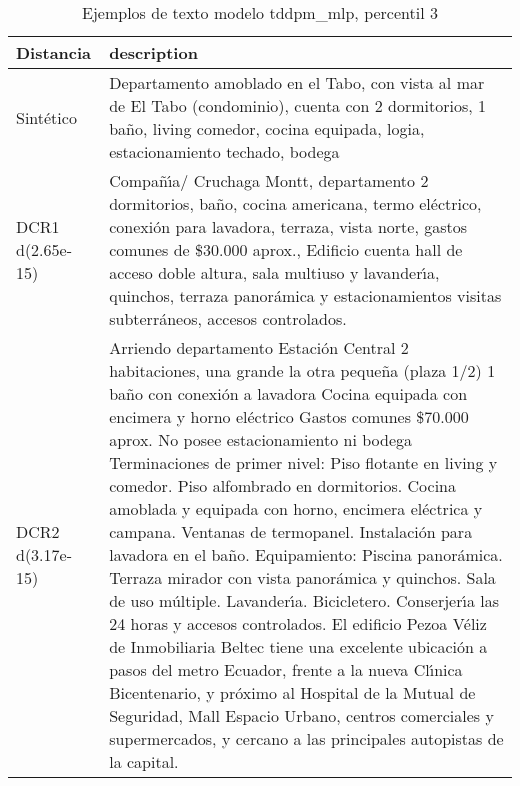 \begin{table}[H]
\centering
\fontsize{10}{14}\selectfont
\caption{Ejemplos de texto modelo tddpm\_mlp, percentil 3}
\label{table-example-economicos-b-1-tddpm_mlp-3p-text}
\begin{tabular}{|l|m{35em}|}
\hline
\rowcolor[gray]{0.8}
Distancia & description \\
\hline Sintético & Departamento amoblado en el Tabo, con vista al mar de El Tabo (condominio), cuenta con 2 dormitorios, 1 ba\~no, living comedor, cocina equipada, logia, estacionamiento techado, bodega \\
\hline DCR1 d(2.65e-15) & Compa\~n{\'\i}a/ Cruchaga Montt, departamento 2 dormitorios, ba\~no, cocina americana, termo el\'ectrico, conexi\'on para lavadora, terraza, vista norte, gastos comunes de \$30.000 aprox.,
 Edificio cuenta hall de acceso doble altura, sala multiuso y lavander{\'\i}a, quinchos, terraza panor\'amica y estacionamientos visitas subterr\'aneos, accesos controlados. \\
\hline DCR2 d(3.17e-15) & Arriendo departamento Estaci\'on Central  2 habitaciones, una grande la otra peque\~na (plaza 1/2) 1 ba\~no con conexi\'on a lavadora Cocina equipada con encimera y horno el\'ectrico Gastos comunes \$70.000 aprox.  No posee estacionamiento ni bodega  Terminaciones de primer nivel:   Piso flotante en living y comedor.   Piso alfombrado en dormitorios.   Cocina amoblada y equipada con horno, encimera el\'ectrica y campana.   Ventanas de termopanel.   Instalaci\'on para lavadora en el ba\~no.  Equipamiento:   Piscina panor\'amica.   Terraza mirador con vista panor\'amica y quinchos.   Sala de uso m\'ultiple.   Lavander{\'\i}a.   Bicicletero.   Conserjer{\'\i}a las 24 horas y accesos controlados.  El edificio Pezoa V\'eliz de Inmobiliaria Beltec tiene una excelente ubicaci\'on a pasos del metro Ecuador, frente a la nueva Cl{\'\i}nica Bicentenario, y pr\'oximo al Hospital de la Mutual de Seguridad, Mall Espacio Urbano, centros comerciales y supermercados, y cercano a las principales autopistas de la capital. \\
\hline
\end{tabular}
\end{table}
